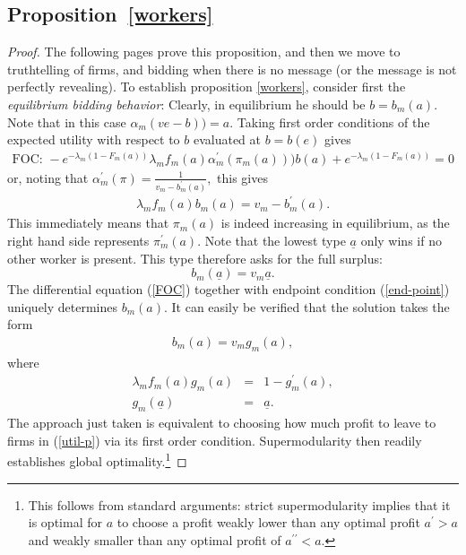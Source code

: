 \documentclass[12pt]{article}
\begin{document}
\subsection{Proposition~\ref{workers}}
\begin{proof}
The following pages prove this proposition, and then we move to truthtelling of firms, and bidding when there is no message (or the message is not perfectly revealing).
To establish proposition \ref{workers}, consider first the \textit{equilibrium bidding behavior}:
Clearly, in equilibrium he should be $b=b_{m}(a).$
Note that in this case $\alpha _{m}(ve-b))=a.$
Taking first order conditions of the expected utility with respect to $b$ evaluated at $b=b(e)$ gives%
\begin{align*}
\text{FOC: }-e^{-\lambda _{m}(1-F_{m}(a))}\lambda _{m}f_{m}(a)\alpha
_{m}^{\prime }(\pi _{m}(a)))b(a)+e^{-\lambda _{m}(1-F_{m}(a))}=0 
\end{align*}
or, noting that $\alpha _{m}^{\prime }(\pi )=\frac{1}{v_{m}-b_{m}^{\prime}(a)},$ this gives 
\begin{align}
\lambda _{m}f_{m}(a)b_{m}(a)=v_{m}-b_{m}^{\prime }(a).  \label{FOC}
\end{align}%
This immediately means that $\pi _{m}(a)$ is indeed increasing in equilibrium, as the right hand side represents $\pi _{m}^{\prime }(a).$
Note that the lowest type $\underline{a}$ only wins if no other worker is present.
This type therefore asks for the full surplus: 
\begin{equation}
b_{m}(\underline{a})=v_{m}\underline{a}.  \label{end-point}
\end{equation}%
The differential equation (\ref{FOC}) together with endpoint condition (\ref{end-point}) uniquely determines $b_{m}(a).$
It can easily be verified that the solution takes the form 
\begin{align}
b_{m}(a)=v_{m}g_{m}(a),  \label{bidding}
\end{align}
where 
\begin{eqnarray}
\lambda _{m}f_{m}(a)g_{m}(a) &=&1-g_{m}^{\prime }(a),  \label{g} \\
g_{m}(\underline{a}) &=&\underline{a}.  \nonumber  \label{g-boundary}
\end{eqnarray}%
The approach just taken is equivalent to choosing how much profit to leave to firms in (\ref{util-p}) via its first order condition.
Supermodularity then readily establishes global optimality.\footnote{%
This follows from standard arguments: strict supermodularity implies that it
is optimal for $a$ to choose a profit weakly lower than any optimal profit $%
a^{\prime }>a$ and weakly smaller than any optimal profit of $a^{\prime
\prime }<a.$}


\end{proof}
\end{document}
